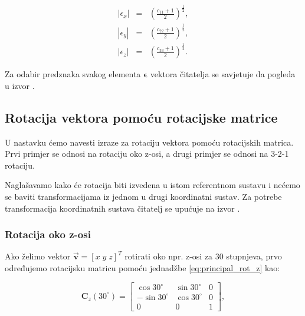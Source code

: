 \documentclass[times, utf8, diplomski, numeric]{templates/template}
\begin{document}
{{{{                \begin{equation}
                \begin{array}{rcl}
                    |\epsilon_{x}| & = & (\frac{c_{11} + 1}{2})^{\frac{1}{2}}, \\
                    |\epsilon_{y}| & = & (\frac{c_{22} + 1}{2})^{\frac{1}{2}}, \\
                    |\epsilon_{z}| & = & (\frac{c_{33} + 1}{2})^{\frac{1}{2}}.
                \end{array}
                \end{equation}

                Za odabir predznaka svakog elementa $\boldsymbol\epsilon$ vektora čitatelja se savjetuje da pogleda u izvor \cite{adcsKnjiga}.
            }
        }

        \subsection{Rotacija vektora pomoću rotacijske matrice}{
            U nastavku ćemo navesti izraze za rotaciju vektora pomoću rotacijskih matrica. Prvi primjer se odnosi na rotaciju oko z-osi, a drugi primjer se odnosi na 3-2-1 rotaciju. 

            Naglašavamo kako će rotacija biti izvedena u istom referentnom sustavu i nećemo se baviti transformacijama iz jednom u drugi koordinatni sustav. Za potrebe transformacija koordinatnih sustava čitatelj se upućuje na izvor \cite{adcsKnjiga}.

            \subsubsection{Rotacija oko z-osi}{
                Ako želimo vektor $\overrightarrow{\boldsymbol{v}}=\left[ x \; y \; z \right]^T$ rotirati oko npr. z-osi za 30 stupnjeva, prvo određujemo rotacijsku matricu pomoću jednadžbe \ref{eq:principal_rot_z} kao:

                \begin{equation}
                \boldsymbol{C}_{z}(30^{\circ}) = 
                \begin{bmatrix}
                    \cos30^{\circ}   & \sin30^{\circ}    &  0 \\
                    -\sin30^{\circ}  & \cos30^{\circ}    &  0 \\
                    0                & 0                 &  1
                \end{bmatrix}
                ,
                \end{equation}

}}}}
\end{document}
